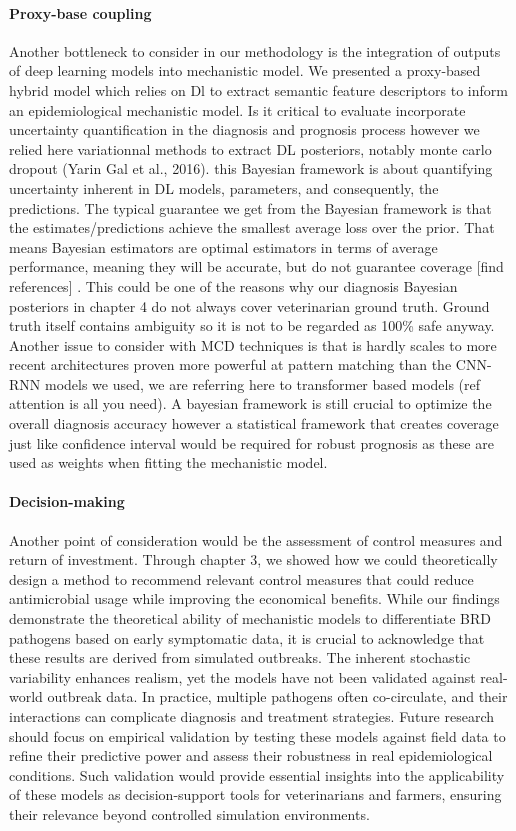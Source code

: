 \paragraph{Proxy-base coupling} Another bottleneck to consider in our methodology is the integration of outputs of deep learning models into mechanistic model. We presented a proxy-based hybrid model which relies on Dl to extract semantic feature descriptors to inform an epidemiological mechanistic model. Is it critical to evaluate incorporate uncertainty quantification in the diagnosis and prognosis process however we relied here variationnal methods to extract DL posteriors, notably monte carlo dropout (Yarin Gal et al., 2016). this Bayesian framework is about quantifying uncertainty inherent in DL models, parameters, and consequently, the predictions. The typical guarantee we get from the Bayesian framework is that the estimates/predictions achieve the smallest average loss over the prior. That means Bayesian estimators are optimal estimators in terms of average performance, meaning they will be accurate, but do not guarantee coverage [find references] . This could be one of the reasons why our diagnosis Bayesian posteriors in chapter 4 do not always cover veterinarian ground truth. Ground truth itself contains ambiguity so it is not to be regarded as 100\% safe anyway. Another issue to consider with MCD techniques is that is hardly scales to more recent architectures proven more powerful at pattern matching than the CNN-RNN models we used, we are referring here to transformer based models (ref attention is all you need). A bayesian framework is still crucial to optimize the overall diagnosis accuracy however a statistical framework that creates coverage just like confidence interval would be required for robust prognosis as these are used as weights when fitting the mechanistic model.

\paragraph{Decision-making} Another point of consideration would be the assessment of control measures and return of investment. Through chapter 3, we showed how we could theoretically design a method to recommend relevant control measures that could reduce antimicrobial usage while improving the economical benefits. While our findings demonstrate the theoretical ability of mechanistic models to differentiate BRD pathogens based on early symptomatic data, it is crucial to acknowledge that these results are derived from simulated outbreaks. The inherent stochastic variability enhances realism, yet the models have not been validated against real-world outbreak data. In practice, multiple pathogens often co-circulate, and their interactions can complicate diagnosis and treatment strategies. Future research should focus on empirical validation by testing these models against field data to refine their predictive power and assess their robustness in real epidemiological conditions. Such validation would provide essential insights into the applicability of these models as decision-support tools for veterinarians and farmers, ensuring their relevance beyond controlled simulation environments.

